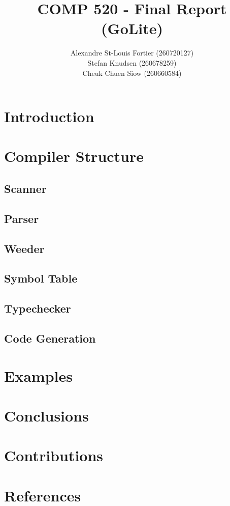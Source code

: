 \documentclass{article}
\begin{document}
\title{COMP 520 - Final Report (GoLite)}
\author{
Alexandre St-Louis Fortier (260720127)\\
Stefan Knudsen (260678259)\\
Cheuk Chuen Siow (260660584)}
\maketitle

\raggedright
\section{Introduction}

\section{Compiler Structure}

\subsection{Scanner}

\subsection{Parser}

\subsection{Weeder}

\subsection{Symbol Table}

\subsection{Typechecker}

\subsection{Code Generation}

\section{Examples}

\section{Conclusions}

\section{Contributions}

\section{References}
\end{document}
